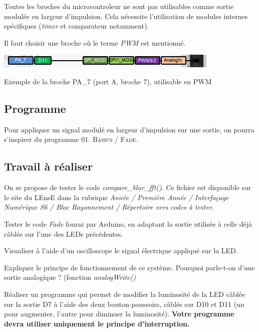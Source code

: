 \documentclass[a4paper,11pt,titlepage]{article} %
\begin{document}
Toutes les broches du microcontroleur ne sont pas utilisables comme sortie modulée en largeur d'impulsion. Cela nécessite l'utilisation de modules internes spécifiques (\textit{timer} et comparateur notamment).

Il faut choisir une broche où le terme \textit{PWM} est mentionné.

\begin{center}
	\includegraphics{images/nucleo_pin_functions.png}
	
	Exemple de la broche PA\_7 (port A, broche 7), utilisable en PWM
\end{center}


\subsection{Programme}

Pour appliquer un signal modulé en largeur d'impulsion sur une sortie, on pourra s'inspirer du programme \textsc{01. Basics / Fade}.



\subsection{Travail à réaliser}

On se propose de tester le code \textsl{compare\_blur\_fft()}. Ce fichier est disponible sur le site du LEnsE dans la rubrique \textit{Année / Première Année / Interfaçage Numérique S6 / Bloc Rayonnement / Répertoire vers codes à tester}.

\Manip Tester le code \textsl{Fade} fourni par Arduino, en adaptant la sortie utilisée à celle déjà câblée sur l'une des LEDs précédentes. 

\Manip Visualiser à l'aide d'un oscilloscope le signal électrique appliqué sur la LED.

\Quest Expliquer le principe de fonctionnement de ce système. Pourquoi parle-t-on d'une sortie analogique ? (fonction \textsl{analogWrite()}

\Manip Réaliser un programme qui permet de modifier la luminosité de la LED câblée sur la sortie D7 à l'aide des deux bouton-poussoirs, câblés sur D10 et D11 (un pour augmenter, l'autre pour diminuer la luminosité). \textbf{Votre programme devra utiliser uniquement le principe d'interruption.}


\newpage
\end{document}
